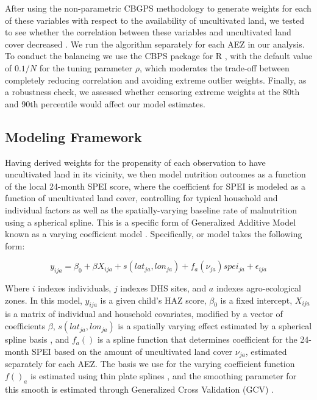 \documentclass{article}
\begin{document}
After using the non-parametric CBGPS methodology to generate weights for each of these variables with respect to the availability of uncultivated land, we tested to see whether the correlation between these variables and uncultivated land cover decreased \cite{Fong2018}.  We run the algorithm separately for each AEZ in our analysis.  To conduct the balancing we use the CBPS package for R \cite{Fong2018a}, with the default value of $0.1/N$ for the tuning parameter $\rho$, which moderates the trade-off between completely reducing correlation and avoiding extreme outlier weights.  Finally, as a robustness check, we assessed whether censoring extreme weights at the 80th and 90th percentile would affect our model estimates.

\subsection{Modeling Framework}
Having derived weights for the propensity of each observation to have uncultivated land in its vicinity, we then model nutrition outcomes as a function of the local 24-month SPEI score, where the coefficient for SPEI is modeled as a function of uncultivated land cover, controlling for typical household and individual factors as well as the spatially-varying baseline rate of malnutrition using a spherical spline.  This is a specific form of Generalized Additive Model \cite{Hastie1986} known as a varying coefficient model \cite{Wood2017}.  Specifically, or model takes the following form:

\begin{equation}
  y_{ija} = \beta_0 + \beta X_{ija} + s(lat_{ja}, lon_{ja}) + f_{a}(\nu_{ja}) spei_{ja} + \epsilon_{ija} \label{eqn:GAM}
\end{equation}

Where $i$ indexes individuals, $j$ indexes DHS sites, and $a$ indexes agro-ecological zones. In this model, $y_{ija}$ is a given child's HAZ score, $\beta_0$ is a fixed intercept, $X_{ija}$ is a matrix of individual and household covariates, modified by a vector of coefficients $\beta$, $s(lat_{ja}, lon_{ja})$ is a spatially varying effect estimated by a spherical spline basis \cite{Wahba1982}, and $f_{a}()$ is a spline function that determines coefficient for the 24-month SPEI based on the amount of uncultivated land cover $\nu_{ja}$, estimated separately for each AEZ.  The basis we use for the varying coefficient function $f()_{a}$ is estimated using thin plate splines \cite{Duchon1977}, and the smoothing parameter for this smooth is estimated through Generalized Cross Validation (GCV) \cite{Wood2017}.
\end{document}
